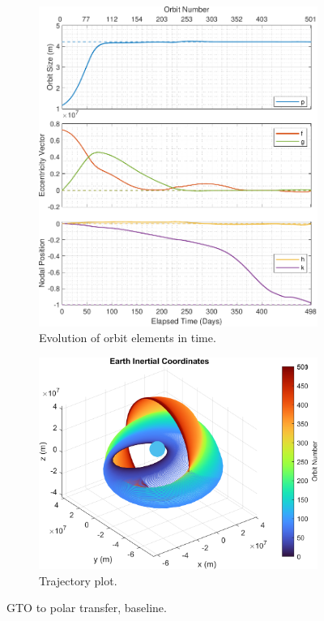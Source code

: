 \begin{figure}[H]
  \centering
  \begin{subfigure}[t]{0.49\textwidth}
    \includegraphics[width=\textwidth]{figures/oguri_G/orbital_elements.pdf}
    \caption{Evolution of orbit elements in time.}
    \label{fig:oguri_base_a}
  \end{subfigure}
  \begin{subfigure}[t]{0.49\textwidth}
    \includegraphics[width=\textwidth]{figures/oguri_G/trajectory_plot.png}
    \caption{Trajectory plot.}
    \label{fig:oguri_base_b}
  \end{subfigure}
  \caption{GTO to polar transfer, baseline.}
  \label{fig:oguri_base}
\end{figure}


